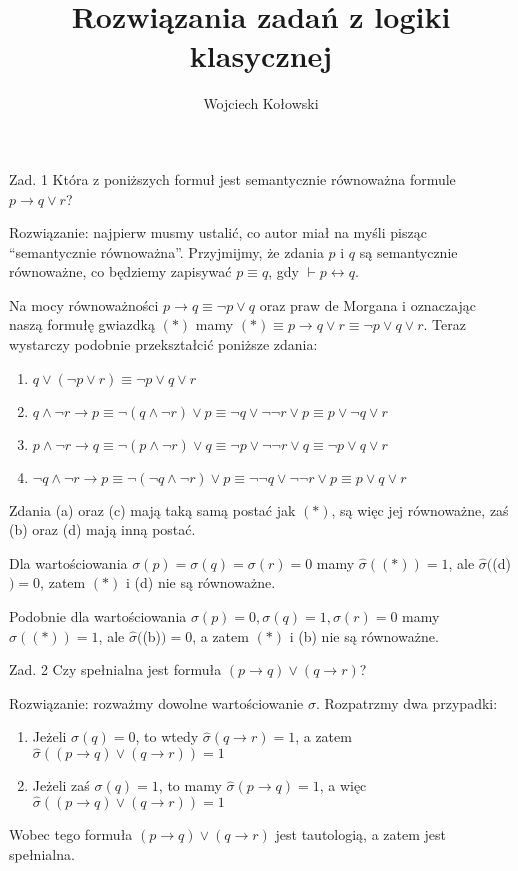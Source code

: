 \documentclass[11pt]{article}
\title{Rozwiązania zadań z logiki klasycznej}
\author{Wojciech Kołowski}
\date{}
\begin{document}
	\maketitle
	
	\par Zad. 1 Która z poniższych formuł jest semantycznie równoważna formule $p \to q \lor r$?
	\par Rozwiązanie: najpierw musmy ustalić, co autor miał na myśli pisząc ``semantycznie równoważna''. Przyjmijmy, że zdania $p$ i $q$ są semantycznie równoważne, co będziemy zapisywać $p \equiv q$, gdy $\vdash p \leftrightarrow q$.
	\par Na mocy równoważności $p \to q \equiv \neg p \lor q$ oraz praw de Morgana i oznaczając naszą formułę gwiazdką $(*)$ mamy $(*) \equiv p \to q \lor r \equiv \neg p \lor q \lor r$. Teraz wystarczy podobnie przekształcić poniższe zdania:
	\begin{enumerate}[label=(\alph*)]
		\item $q \lor (\neg p \lor r) \equiv \neg p \lor q \lor r$
		\item $q \land \neg r \to p \equiv \neg (q \land \neg r) \lor p \equiv \neg q \lor \neg \neg r \lor p \equiv p \lor \neg q \lor r$
		\item $p \land \neg r \to q \equiv \neg (p \land \neg r) \lor q \equiv \neg p \lor \neg \neg r \lor q \equiv \neg p \lor q \lor r$
		\item $\neg q \land \neg r \to p \equiv \neg (\neg q \land \neg r) \lor p \equiv \neg \neg q \lor \neg \neg r \lor p \equiv p \lor q \lor r$
	\end{enumerate}
	\par Zdania (a) oraz (c) mają taką samą postać jak $(*)$, są więc jej równoważne, zaś (b) oraz (d) mają inną postać.
	\par Dla wartościowania $\sigma(p) = \sigma(q) = \sigma(r) = 0$ mamy $\hat{\sigma}((*)) = 1$, ale $\hat{\sigma}($(d)$) = 0$, zatem $(*)$ i (d) nie są równoważne.
	\par Podobnie dla wartościowania $\sigma(p) = 0, \sigma(q) = 1, \sigma(r) = 0$ mamy $\hat{\sigma}((*)) = 1$, ale $\hat{\sigma}($(b)$) = 0$, a zatem $(*)$ i (b) nie są równoważne.
	
	\newpage
	
	\par Zad. 2 Czy spełnialna jest formuła $(p \to q) \lor (q \to r)$?
	\par Rozwiązanie: rozważmy dowolne wartościowanie $\sigma$. Rozpatrzmy dwa przypadki:
	\begin{enumerate}
		\item Jeżeli $\sigma(q) = 0$, to wtedy $\hat{\sigma}(q \to r) = 1$, a zatem $\hat{\sigma}((p \to q) \lor (q \to r)) = 1$
		\item Jeżeli zaś $\sigma(q) = 1$, to mamy $\hat{\sigma}(p \to q) = 1$, a więc $\hat{\sigma}((p \to q) \lor (q \to r)) = 1$
	\end{enumerate}
	\par Wobec tego formuła $(p \to q) \lor (q \to r)$ jest tautologią, a zatem jest spełnialna.
	
\end{document}
